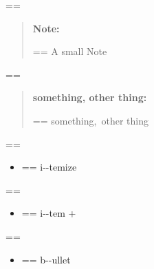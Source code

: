 \documentclass{book}
\makeatletter
\newenvironment{GNUTexinfopreformatted}{%
  \par\GNUTobeylines\obeyspaces\frenchspacing
  \parskip=\z@\parindent=\z@}{}
{\catcode`\^^M=13 \gdef\GNUTobeylines{\catcode`\^^M=13 \def^^M{\null\par}}}
\newenvironment{GNUTexinfoindented}
  {\begin{list}{}{}
  \item\relax}
  {\end{list}}
\makeatother
\begin{document}
\begin{GNUTexinfoindented}
\begin{quote}
\end{quote}
\begin{GNUTexinfopreformatted}%
\ttfamily 
\end{GNUTexinfopreformatted}
\begin{quote}
\begin{footnotesize}
\textbf{Note:} \begin{GNUTexinfopreformatted}%
\ttfamily A small Note
\end{GNUTexinfopreformatted}
\end{footnotesize}
\end{quote}
\begin{GNUTexinfopreformatted}%
\ttfamily 
\end{GNUTexinfopreformatted}
\begin{quote}
\begin{footnotesize}
\textbf{something, other thing:} \begin{GNUTexinfopreformatted}%
\ttfamily something,\ other thing
\end{GNUTexinfopreformatted}
\end{footnotesize}
\end{quote}
\begin{GNUTexinfopreformatted}%
\ttfamily 
\end{GNUTexinfopreformatted}
\begin{itemize}
\item \begin{GNUTexinfopreformatted}%
\ttfamily i{-}{-}temize
\end{GNUTexinfopreformatted}
\end{itemize}
\begin{GNUTexinfopreformatted}%
\ttfamily 
\end{GNUTexinfopreformatted}
\begin{itemize}[label=+]
\item \begin{GNUTexinfopreformatted}%
\ttfamily i{-}{-}tem +
\end{GNUTexinfopreformatted}
\end{itemize}
\begin{GNUTexinfopreformatted}%
\ttfamily 
\end{GNUTexinfopreformatted}
\begin{itemize}[label=\textbullet{}]
\item \begin{GNUTexinfopreformatted}%
\ttfamily b{-}{-}ullet
\end{GNUTexinfopreformatted}
\end{itemize}

\end{GNUTexinfoindented}
\end{document}

